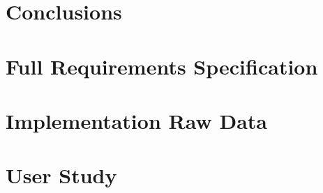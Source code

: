 \documentclass[11pt, a4paper, openright]{report}
\begin{document}
\chapter{Conclusions}
\label{c:conclusions}




\begin{appendices}
\chapter{Full Requirements Specification}


\chapter{Implementation Raw Data}


\chapter{User Study}

	
\end{appendices}
\end{document}
